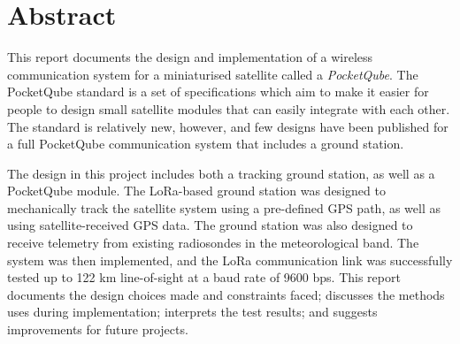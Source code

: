\chapter*{Abstract}
\makeatletter{}\makeatother

This report documents the design and implementation of a wireless communication system for a miniaturised satellite called a \textit{PocketQube}. The PocketQube standard is a set of specifications which aim to make it easier for people to design small satellite modules that can easily integrate with each other. The standard is relatively new, however, and few designs have been published for a full PocketQube communication system that includes a ground station.

The design in this project includes both a tracking ground station, as well as a PocketQube module. The LoRa-based ground station was designed to mechanically track the satellite system using a pre-defined GPS path, as well as using satellite-received GPS data. The ground station was also designed to receive telemetry from existing radiosondes in the meteorological band. The system was then implemented, and the LoRa communication link was successfully tested up to 122 km line-of-sight at a baud rate of 9600 bps. This report documents the design choices made and constraints faced; discusses the methods uses during implementation; interprets the test results; and suggests improvements for future projects.


